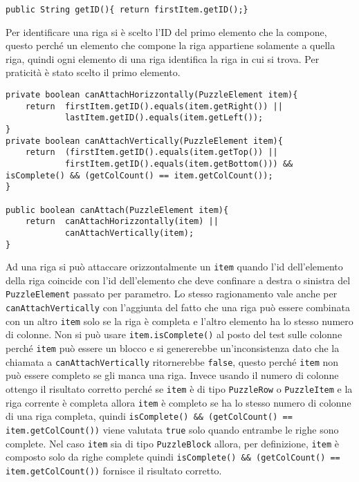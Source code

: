 \documentclass[a4paper, 11pt]{article}
\begin{document}
\begin{lstlisting}
public String getID(){ return firstItem.getID();}
\end{lstlisting}
Per identificare una riga si è scelto l'ID del primo elemento che la compone, questo perché un elemento che compone la riga appartiene solamente a quella riga, quindi ogni elemento di una riga identifica la riga in cui si trova. Per praticità è stato scelto il primo elemento.
\begin{lstlisting}
private boolean canAttachHorizzontally(PuzzleElement item){
    return	firstItem.getID().equals(item.getRight()) ||
            lastItem.getID().equals(item.getLeft());
}
private boolean canAttachVertically(PuzzleElement item){
	return	(firstItem.getID().equals(item.getTop()) ||
            firstItem.getID().equals(item.getBottom())) && isComplete() && (getColCount() == item.getColCount());
}

public boolean canAttach(PuzzleElement item){
    return	canAttachHorizzontally(item) ||
            canAttachVertically(item);
}
\end{lstlisting}
Ad una riga si può attaccare orizzontalmente un \texttt{item} quando l'id dell'elemento della riga coincide con l'id dell'elemento che deve confinare a destra o sinistra del \texttt{PuzzleElement} passato per parametro.
Lo stesso ragionamento vale anche per \texttt{canAttachVertically} con l'aggiunta del fatto che una riga può essere combinata con un altro \texttt{item} solo se la riga è completa e l'altro elemento ha lo stesso numero di colonne.
Non si può usare \texttt{item.isComplete()} al posto del test sulle colonne perché \texttt{item} può essere un blocco e si genererebbe un'inconsistenza dato che la chiamata a \texttt{canAttachVertically} ritornerebbe \texttt{false}, questo perché \texttt{item} non può essere completo se gli manca una riga.
Invece usando il numero di colonne ottengo il risultato corretto perché se \texttt{item} è di tipo \texttt{PuzzleRow} o \texttt{PuzzleItem} e la riga corrente è completa allora \texttt{item} è completo se ha lo stesso numero di colonne di una riga completa, quindi \texttt{isComplete() \&\& (getColCount() == item.getColCount())} viene valutata \texttt{true} solo quando entrambe le righe sono complete.
Nel caso \texttt{item} sia di tipo \texttt{PuzzleBlock} allora, per definizione, \texttt{item} è composto solo da righe complete quindi \texttt{isComplete() \&\& (getColCount() == item.getColCount())} fornisce il risultato corretto.
\end{document}
